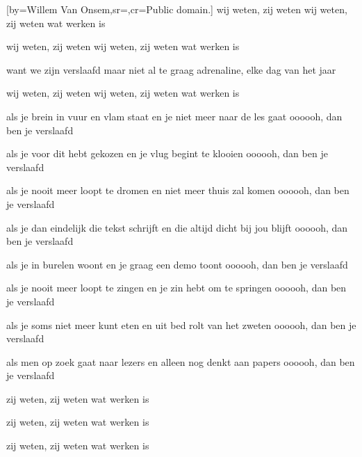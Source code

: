 [by={Willem Van Onsem},sr={},cr={Public domain.}]
\beginchorus
wij weten, zij weten
wij weten, zij weten
wat werken is

wij weten, zij weten
wij weten, zij weten
wat werken is

want we zijn verslaafd
maar niet al te graag
adrenaline, elke dag van het jaar

wij weten, zij weten
wij weten, zij weten
wat werken is
\endchorus

\beginverse
als je brein in vuur en vlam staat
en je niet meer naar de les gaat
oooooh, dan ben je verslaafd

als je voor dit hebt gekozen
en je vlug begint te klooien
oooooh, dan ben je verslaafd

als je nooit meer loopt te dromen
en niet meer thuis zal komen
oooooh, dan ben je verslaafd

als je dan eindelijk die tekst schrijft
en die altijd dicht bij jou blijft
oooooh, dan ben je verslaafd
\endverse

\beginverse
als je in burelen woont
en je graag een demo toont
oooooh, dan ben je verslaafd

als je nooit meer loopt te zingen
en je zin hebt om te springen
oooooh, dan ben je verslaafd

als je soms niet meer kunt eten
en uit bed rolt van het zweten
oooooh, dan ben je verslaafd

als men op zoek gaat naar lezers
en alleen nog denkt aan papers
oooooh, dan ben je verslaafd
\endverse

\beginverse
zij weten, zij weten
wat werken is

zij weten, zij weten
wat werken is

zij weten, zij weten
wat werken is
\endverse

\endsong